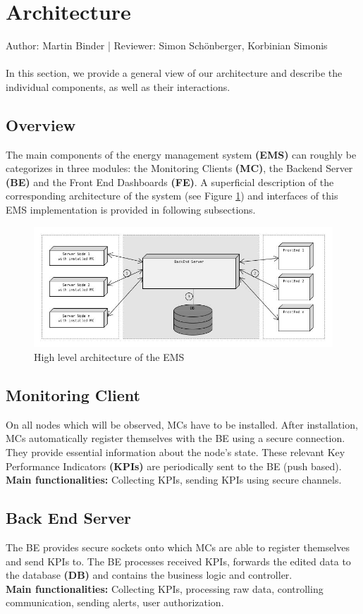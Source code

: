 \documentclass{scrreprt}
\begin{document}
\section{Architecture}
Author: Martin Binder |
Reviewer: Simon Sch\"onberger, Korbinian Simonis\\ \\
In this section, we provide a general view of our architecture and describe the individual components, as well as their interactions.
\subsection{Overview}

The main components of the energy management system \textbf{(EMS)} can roughly be categorizes in three modules: the Monitoring Clients \textbf{(MC)}, the Backend Server \textbf{(BE)} and the Front End Dashboards \textbf{(FE)}. 
A superficial description of the corresponding architecture of the system (see Figure \ref{architectur})  and interfaces of this EMS implementation is provided in following subsections. 
\begin{figure}[h]
	\includegraphics[width=\linewidth]{architectureFigure1.jpg}
	\caption{High level architecture of the EMS}
	\label{architectur}
\end{figure}
\subsection{Monitoring Client}
On all nodes which will be observed, MCs have to be installed. After installation, MCs automatically register themselves with the BE using a secure connection. They provide essential information about the node's state. These relevant Key Performance Indicators \textbf{(KPIs)} are periodically sent to the BE (push based).
\\ \textbf{Main functionalities:} Collecting KPIs, sending KPIs using secure channels.
\subsection{Back End Server}
The BE provides secure sockets onto which MCs are able to register themselves and send KPIs to. 
The BE processes received KPIs, forwards the edited data to the database \textbf{(DB)} and contains the business logic and controller.
\\ \textbf{Main functionalities:} Collecting KPIs, processing raw data, controlling communication, sending alerts, user authorization.
\end{document}
